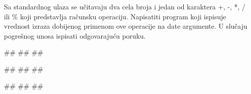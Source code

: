 \begin{Exercise}[label=p1.2_14] 
 Sa standardnog ulaza se učitavaju dva cela broja i jedan od karaktera +, -, *, / ili \% koji predstavlja računsku operaciju. Napisatiti program koji  ispisuje vrednost izraza dobijenog primenom ove operacije na date argumente. U slučaju pogrešnog unosa ispisati odgovarajuću poruku. 
 

 \begin{miditest}
\begin{upotreba}{1}
#\naslovInt#
##
##
\end{upotreba}
\end{miditest}
\begin{miditest}
\begin{upotreba}{2}
#\naslovInt#
##
##
\end{upotreba}
\end{miditest}

\begin{miditest}
\begin{upotreba}{3}
#\naslovInt#
##
##
\end{upotreba}
\end{miditest}
\end{Exercise}
\begin{Answer}[ref=p1.2_14]
\end{Answer}




